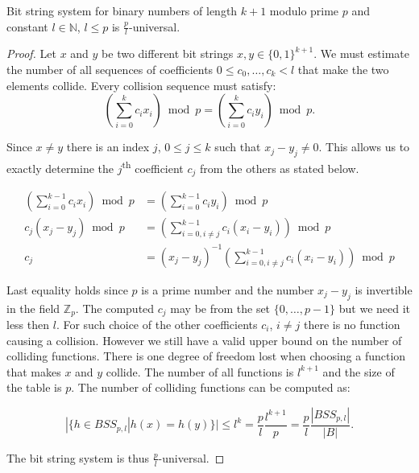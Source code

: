 \begin{remark}
Bit string system for binary numbers of length $k + 1$ modulo prime $p$ and constant $l \in \mathbb{N}$, $l \leq p$ is $\frac{p}{l}$-universal.
\end{remark}
\begin{proof}
Let $x$ and $y$ be two different bit strings $x, y \in \{0, 1\} ^ {k + 1}$. We must estimate the number of all sequences of coefficients $0 \leq c_0, \dots, c_k < l$ that make the two elements collide. Every collision sequence must satisfy:
\[
\left( \displaystyle \sum_{i = 0}^{k} c_i x_i \right) \bmod p = \left( \displaystyle \sum_{i = 0}^{k} c_i y_i \right) \bmod p \text{.}
\]

Since $x \neq y$ there is an index $j$, $0 \leq j \leq k$ such that $x_j - y_j \neq 0$. This allows us to exactly determine the $j$\textsuperscript{th} coefficient $c_j$ from the others as stated below.

\begin{displaymath}
\begin{split}
\left(\displaystyle \sum_{i=0}^{k-1} c_i x_i\right) \bmod p & = \left(\displaystyle \sum_{i=0}^{k-1} c_i y_i\right) \bmod p \\
c_j(x_j - y_j) \bmod p & = \left(\displaystyle \sum_{i=0, i \neq j}^{k-1} c_i (x_i - y_i)\right) \bmod p \\
c_j & = (x_j - y_j) ^ {-1}\left(\displaystyle \sum_{i=0, i \neq j}^{k-1} c_i (x_i - y_i)\right) \bmod p
\end{split}
\end{displaymath}

Last equality holds since $p$ is a prime number and the number $x_j - y_j$ is invertible in the field $\mathbb{Z}_p$. The computed $c_j$ may be from the set $\{0, \dots, p - 1\}$ but we need it less then $l$. For such choice of the other coefficients $c_i$, $i \neq j$ there is no function causing a collision. However we still have a valid upper bound on the number of colliding functions. There is one degree of freedom lost when choosing a function that makes $x$ and $y$ collide. The number of all functions is $l ^ {k + 1}$ and the size of the table is $p$. The number of colliding functions can be computed as:

\begin{displaymath}
|\{h \in BSS_{p, l} | h(x) = h(y) \}| \leq l^{k} = \frac{p}{l}\frac{l^{k + 1}}{p} = \frac{p}{l}\frac{|BSS_{p, l}|}{|B|} \text{.}
\end{displaymath}

The bit string system is thus $\frac{p}{l}$-universal.
\end{proof}

